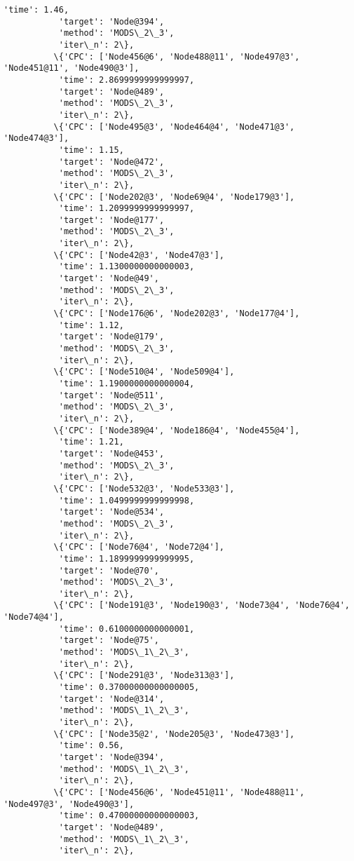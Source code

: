 \documentclass[11pt]{article}
\begin{document}
\begin{Verbatim}[commandchars=\\\{\}]
           'time': 1.46,
           'target': 'Node@394',
           'method': 'MODS\_2\_3',
           'iter\_n': 2\},
          \{'CPC': ['Node456@6', 'Node488@11', 'Node497@3', 'Node451@11', 'Node490@3'],
           'time': 2.8699999999999997,
           'target': 'Node@489',
           'method': 'MODS\_2\_3',
           'iter\_n': 2\},
          \{'CPC': ['Node495@3', 'Node464@4', 'Node471@3', 'Node474@3'],
           'time': 1.15,
           'target': 'Node@472',
           'method': 'MODS\_2\_3',
           'iter\_n': 2\},
          \{'CPC': ['Node202@3', 'Node69@4', 'Node179@3'],
           'time': 1.2099999999999997,
           'target': 'Node@177',
           'method': 'MODS\_2\_3',
           'iter\_n': 2\},
          \{'CPC': ['Node42@3', 'Node47@3'],
           'time': 1.1300000000000003,
           'target': 'Node@49',
           'method': 'MODS\_2\_3',
           'iter\_n': 2\},
          \{'CPC': ['Node176@6', 'Node202@3', 'Node177@4'],
           'time': 1.12,
           'target': 'Node@179',
           'method': 'MODS\_2\_3',
           'iter\_n': 2\},
          \{'CPC': ['Node510@4', 'Node509@4'],
           'time': 1.1900000000000004,
           'target': 'Node@511',
           'method': 'MODS\_2\_3',
           'iter\_n': 2\},
          \{'CPC': ['Node389@4', 'Node186@4', 'Node455@4'],
           'time': 1.21,
           'target': 'Node@453',
           'method': 'MODS\_2\_3',
           'iter\_n': 2\},
          \{'CPC': ['Node532@3', 'Node533@3'],
           'time': 1.0499999999999998,
           'target': 'Node@534',
           'method': 'MODS\_2\_3',
           'iter\_n': 2\},
          \{'CPC': ['Node76@4', 'Node72@4'],
           'time': 1.1899999999999995,
           'target': 'Node@70',
           'method': 'MODS\_2\_3',
           'iter\_n': 2\},
          \{'CPC': ['Node191@3', 'Node190@3', 'Node73@4', 'Node76@4', 'Node74@4'],
           'time': 0.6100000000000001,
           'target': 'Node@75',
           'method': 'MODS\_1\_2\_3',
           'iter\_n': 2\},
          \{'CPC': ['Node291@3', 'Node313@3'],
           'time': 0.37000000000000005,
           'target': 'Node@314',
           'method': 'MODS\_1\_2\_3',
           'iter\_n': 2\},
          \{'CPC': ['Node35@2', 'Node205@3', 'Node473@3'],
           'time': 0.56,
           'target': 'Node@394',
           'method': 'MODS\_1\_2\_3',
           'iter\_n': 2\},
          \{'CPC': ['Node456@6', 'Node451@11', 'Node488@11', 'Node497@3', 'Node490@3'],
           'time': 0.47000000000000003,
           'target': 'Node@489',
           'method': 'MODS\_1\_2\_3',
           'iter\_n': 2\},

\end{Verbatim}
\end{document}

